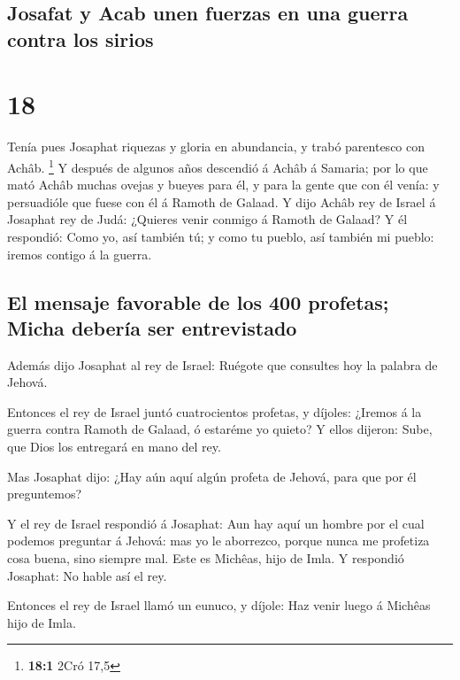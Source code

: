 \hypertarget{josafat-y-acab-unen-fuerzas-en-una-guerra-contra-los-sirios}{%
\subsection{Josafat y Acab unen fuerzas en una guerra contra los
sirios}\label{josafat-y-acab-unen-fuerzas-en-una-guerra-contra-los-sirios}}

\hypertarget{section-17}{%
\section{18}\label{section-17}}

 Tenía pues Josaphat riquezas y gloria en abundancia, y
trabó parentesco con Achâb. \footnote{\textbf{18:1} 2Cró 17,5}
 Y después de algunos años descendió á Achâb á Samaria; por
lo que mató Achâb muchas ovejas y bueyes para él, y para la gente que
con él venía: y persuadióle que fuese con él á Ramoth de Galaad.
 Y dijo Achâb rey de Israel á Josaphat rey de Judá: ¿Quieres
venir conmigo á Ramoth de Galaad? Y él respondió: Como yo, así también
tú; y como tu pueblo, así también mi pueblo: iremos contigo á la guerra.

\hypertarget{el-mensaje-favorable-de-los-400-profetas-micha-deberuxeda-ser-entrevistado}{%
\subsection{El mensaje favorable de los 400 profetas; Micha debería ser
entrevistado}\label{el-mensaje-favorable-de-los-400-profetas-micha-deberuxeda-ser-entrevistado}}

 Además dijo Josaphat al rey de Israel: Ruégote que
consultes hoy la palabra de Jehová.

 Entonces el rey de Israel juntó cuatrocientos profetas, y
díjoles: ¿Iremos á la guerra contra Ramoth de Galaad, ó estaréme yo
quieto? Y ellos dijeron: Sube, que Dios los entregará en mano del rey.

 Mas Josaphat dijo: ¿Hay aún aquí algún profeta de Jehová,
para que por él preguntemos?

 Y el rey de Israel respondió á Josaphat: Aun hay aquí un
hombre por el cual podemos preguntar á Jehová: mas yo le aborrezco,
porque nunca me profetiza cosa buena, sino siempre mal. Este es Michêas,
hijo de Imla. Y respondió Josaphat: No hable así el rey.

 Entonces el rey de Israel llamó un eunuco, y díjole: Haz
venir luego á Michêas hijo de Imla.


